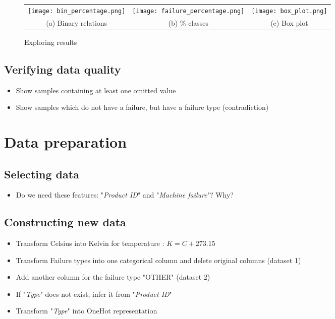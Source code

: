 \documentclass[11pt, a4paper]{article}
\begin{document}
\begin{figure}[ht]
	\centering
	\begin{tabular}{ccc}
		\texttt{[image: bin\_percentage.png]} &
		\texttt{[image: failure\_percentage.png]} &
		\texttt{[image: box\_plot.png]} \\
		(a) Binary relations &
		(b) \% classes  &
		(c) Box plot \\
	\end{tabular}
	\caption{Exploring results}
	\label{res-explore}
\end{figure}

\begin{multicols}{2}
	
\subsection{Verifying data quality}

\begin{itemize}
	\item Show samples containing at least one omitted value
	\item Show samples which do not have a failure, but have a failure type (contradiction)
\end{itemize}

\section{Data preparation}

\subsection{Selecting data}

\begin{itemize}
	\item Do we need these features: "\textit{Product ID}" and "\textit{Machine failure}"? Why?
\end{itemize}

\subsection{Constructing new data}

\begin{itemize}
	\item Transform Celsius into Kelvin for temperature : $ K = C + 273.15 $
	\item Transform Failure types into one categorical column and delete original columns (dataset 1)
	\item Add another column for the failure type "OTHER" (dataset 2)
	\item If "\textit{Type}" does not exist, infer it from "\textit{Product ID}"
	\item Transform "\textit{Type}" into OneHot representation
\end{itemize}


\end{multicols}
\end{document}
